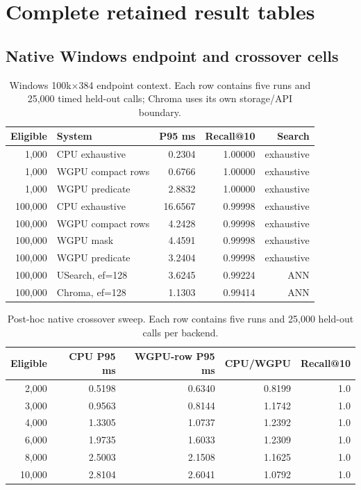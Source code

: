 \section{Complete retained result tables}

\subsection{Native Windows endpoint and crossover cells}
\begin{table}[H]
\centering\scriptsize
\caption{Windows 100k$\times$384 endpoint context. Each row contains five runs and 25,000 timed held-out calls; Chroma uses its own storage/API boundary.}
\begin{tabular}{rlrrr}
\toprule
Eligible & System & P95 ms & Recall@10 & Search \\
\midrule
1,000 & CPU exhaustive & 0.2304 & 1.00000 & exhaustive \\
1,000 & WGPU compact rows & 0.6766 & 1.00000 & exhaustive \\
1,000 & WGPU predicate & 2.8832 & 1.00000 & exhaustive \\
100,000 & CPU exhaustive & 16.6567 & 0.99998 & exhaustive \\
100,000 & WGPU compact rows & 4.2428 & 0.99998 & exhaustive \\
100,000 & WGPU mask & 4.4591 & 0.99998 & exhaustive \\
100,000 & WGPU predicate & 3.2404 & 0.99998 & exhaustive \\
100,000 & USearch, ef=128 & 3.6245 & 0.99224 & ANN \\
100,000 & Chroma, ef=128 & 1.1303 & 0.99414 & ANN \\
\bottomrule
\end{tabular}
\end{table}

\begin{table}[H]
\centering\scriptsize
\caption{Post-hoc native crossover sweep. Each row contains five runs and 25,000 held-out calls per backend.}
\begin{tabular}{rrrrr}
\toprule
Eligible & CPU P95 ms & WGPU-row P95 ms & CPU/WGPU & Recall@10 \\
\midrule
2,000 & 0.5198 & 0.6340 & 0.8199 & 1.0 \\
3,000 & 0.9563 & 0.8144 & 1.1742 & 1.0 \\
4,000 & 1.3305 & 1.0737 & 1.2392 & 1.0 \\
6,000 & 1.9735 & 1.6033 & 1.2309 & 1.0 \\
8,000 & 2.5003 & 2.1508 & 1.1625 & 1.0 \\
10,000 & 2.8104 & 2.6041 & 1.0792 & 1.0 \\
\bottomrule
\end{tabular}
\end{table}

